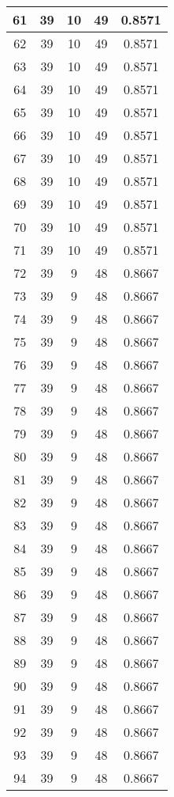 \documentclass[letterpaper, 12pt]{article}
\begin{document}
\begin{longtable}{|c|c|c|c|c|}
\hline
61 & 39 & 10 & 49 & 0.8571 \\
\hline
62 & 39 & 10 & 49 & 0.8571 \\
\hline
63 & 39 & 10 & 49 & 0.8571 \\
\hline
64 & 39 & 10 & 49 & 0.8571 \\
\hline
65 & 39 & 10 & 49 & 0.8571 \\
\hline
66 & 39 & 10 & 49 & 0.8571 \\
\hline
67 & 39 & 10 & 49 & 0.8571 \\
\hline
68 & 39 & 10 & 49 & 0.8571 \\
\hline
69 & 39 & 10 & 49 & 0.8571 \\
\hline
70 & 39 & 10 & 49 & 0.8571 \\
\hline
71 & 39 & 10 & 49 & 0.8571 \\
\hline
72 & 39 & 9 & 48 & 0.8667 \\
\hline
73 & 39 & 9 & 48 & 0.8667 \\
\hline
74 & 39 & 9 & 48 & 0.8667 \\
\hline
75 & 39 & 9 & 48 & 0.8667 \\
\hline
76 & 39 & 9 & 48 & 0.8667 \\
\hline
77 & 39 & 9 & 48 & 0.8667 \\
\hline
78 & 39 & 9 & 48 & 0.8667 \\
\hline
79 & 39 & 9 & 48 & 0.8667 \\
\hline
80 & 39 & 9 & 48 & 0.8667 \\
\hline
81 & 39 & 9 & 48 & 0.8667 \\
\hline
82 & 39 & 9 & 48 & 0.8667 \\
\hline
83 & 39 & 9 & 48 & 0.8667 \\
\hline
84 & 39 & 9 & 48 & 0.8667 \\
\hline
85 & 39 & 9 & 48 & 0.8667 \\
\hline
86 & 39 & 9 & 48 & 0.8667 \\
\hline
87 & 39 & 9 & 48 & 0.8667 \\
\hline
88 & 39 & 9 & 48 & 0.8667 \\
\hline
89 & 39 & 9 & 48 & 0.8667 \\
\hline
90 & 39 & 9 & 48 & 0.8667 \\
\hline
91 & 39 & 9 & 48 & 0.8667 \\
\hline
92 & 39 & 9 & 48 & 0.8667 \\
\hline
93 & 39 & 9 & 48 & 0.8667 \\
\hline
94 & 39 & 9 & 48 & 0.8667 \\
\hline

\end{longtable}
\end{document}
